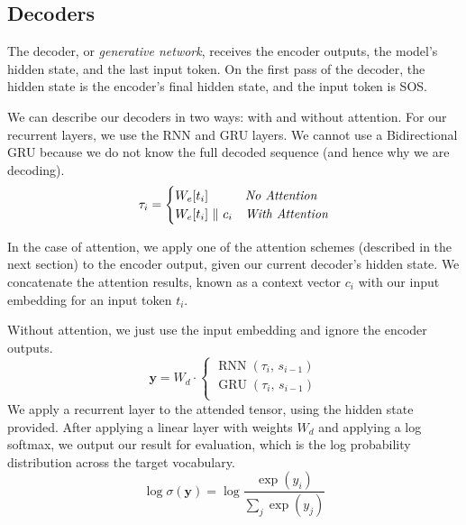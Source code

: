 \documentclass[twoside,twocolumn]{article}
\begin{document}
\subsection{Decoders}
The decoder, or \emph{generative network}, receives the encoder outputs, the
model's hidden state, and the last input token. On the first pass of the
decoder, the hidden state is the encoder's final hidden state, and the
input token is SOS.

We can describe our decoders in two ways: with and without attention. For
our recurrent layers, we use the RNN and GRU layers. We cannot use a
Bidirectional GRU because we do not know the full decoded sequence
(and hence why we are decoding).
\begin{equation}
  \tau_i = \begin{cases}
    W_e[t_i] & \emph{No Attention} \\
    W_e[t_i] \,\, \Vert \,\, c_i & \emph{With Attention} \\
  \end{cases}
\end{equation}

In the case of attention, we apply one of the attention schemes (described in
the next section) to the encoder output, given our current decoder's
hidden state. We concatenate the attention results, known as a context vector
$c_i$ with our input embedding for an input token $t_i$.

Without attention, we just use the input embedding and ignore the encoder
outputs.
\begin{equation}
  \mathbf{y} = W_d \cdot \begin{cases}
      \operatorname{RNN} (\tau_i, \, s_{i-1}) \\
      \operatorname{GRU} (\tau_i, \, s_{i-1}) \\
    \end{cases}
\end{equation}
We apply a recurrent layer to the attended tensor, using the hidden state
provided. After applying a linear layer with weights $W_d$ and applying a log
softmax, we output our result for evaluation, which is the log probability
distribution across the target vocabulary.
\begin{equation}
  \log \sigma(\mathbf{y}) = \log \frac{\exp(y_i)}{\sum_j \exp(y_j)}
\end{equation}
\end{document}
